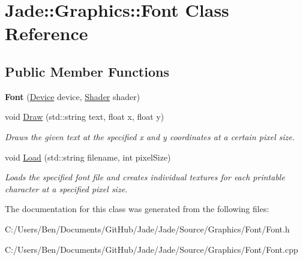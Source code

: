 \hypertarget{class_jade_1_1_graphics_1_1_font}{}\section{Jade\+:\+:Graphics\+:\+:Font Class Reference}
\label{class_jade_1_1_graphics_1_1_font}
\subsection*{Public Member Functions}
\begin{DoxyCompactItemize}
\item 
\hypertarget{class_jade_1_1_graphics_1_1_font_a5b62fed86d7603bdf722ea64872dc1dc}{}{\bfseries Font} (\hyperlink{class_jade_1_1_graphics_1_1_device}{Device} device, \hyperlink{class_jade_1_1_graphics_1_1_shader}{Shader} shader)\label{class_jade_1_1_graphics_1_1_font_a5b62fed86d7603bdf722ea64872dc1dc}

\item 
\hypertarget{class_jade_1_1_graphics_1_1_font_ac1943d12d863c841fbcdc15d7a09c101}{}void \hyperlink{class_jade_1_1_graphics_1_1_font_ac1943d12d863c841fbcdc15d7a09c101}{Draw} (std\+::string text, float x, float y)\label{class_jade_1_1_graphics_1_1_font_ac1943d12d863c841fbcdc15d7a09c101}

\begin{DoxyCompactList}\small\item\em Draws the given text at the specified x and y coordinates at a certain pixel size. \end{DoxyCompactList}\item 
\hypertarget{class_jade_1_1_graphics_1_1_font_abfb005d92619b01dc10b2a94693adffe}{}void \hyperlink{class_jade_1_1_graphics_1_1_font_abfb005d92619b01dc10b2a94693adffe}{Load} (std\+::string filename, int pixel\+Size)\label{class_jade_1_1_graphics_1_1_font_abfb005d92619b01dc10b2a94693adffe}

\begin{DoxyCompactList}\small\item\em Loads the specified font file and creates individual textures for each printable character at a specified pixel size. \end{DoxyCompactList}\end{DoxyCompactItemize}


The documentation for this class was generated from the following files\+:\begin{DoxyCompactItemize}
\item 
C\+:/\+Users/\+Ben/\+Documents/\+Git\+Hub/\+Jade/\+Jade/\+Source/\+Graphics/\+Font/Font.\+h\item 
C\+:/\+Users/\+Ben/\+Documents/\+Git\+Hub/\+Jade/\+Jade/\+Source/\+Graphics/\+Font/Font.\+cpp\end{DoxyCompactItemize}
